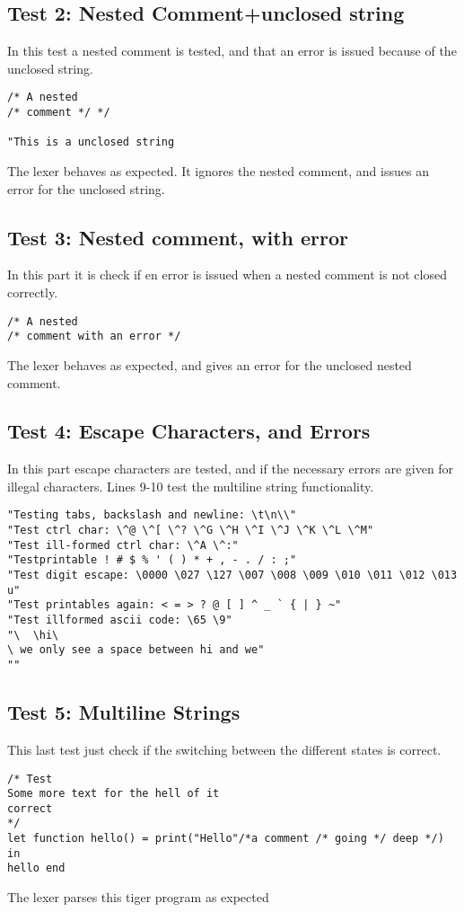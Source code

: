 \documentclass{article}
\begin{document}
\subsection{Test 2: Nested Comment+unclosed string}
In this test a nested comment is tested, and that an error is issued because of the unclosed string.

\begin{lstlisting}[frame=single]
/* A nested
/* comment */ */

"This is a unclosed string
\end{lstlisting}

The lexer behaves as expected. It ignores the nested comment, and issues an error for the unclosed string.

\subsection{Test 3: Nested comment, with error}
In this part it is check if en error is issued when a nested comment is not closed correctly.

\begin{lstlisting}[frame=single]
/* A nested
/* comment with an error */ 

\end{lstlisting}

The lexer behaves as expected, and gives an error for the unclosed nested comment.

\subsection{Test 4: Escape Characters, and Errors}
In this part escape characters are tested, and if the necessary errors are given for illegal characters.
Lines 9-10 test the multiline string functionality.


\begin{lstlisting}[frame=single]
"Testing tabs, backslash and newline: \t\n\\"
"Test ctrl char: \^@ \^[ \^? \^G \^H \^I \^J \^K \^L \^M"
"Test ill-formed ctrl char: \^A \^:"
"Testprintable ! # $ % ' ( ) * + , - . / : ;"
"Test digit escape: \0000 \027 \127 \007 \008 \009 \010 \011 \012 \013 u"
"Test printables again: < = > ? @ [ ] ^ _ ` { | } ~"
"Test illformed ascii code: \65 \9"
"\	\hi\
\ we only see a space between hi and we"
""
\end{lstlisting}

\subsection{Test 5: Multiline Strings}
This last test just check if the switching between the different states is correct.


\begin{lstlisting}[frame=single]
/* Test 
Some more text for the hell of it
correct
*/
let function hello() = print("Hello"/*a comment /* going */ deep */) in 
hello end
\end{lstlisting}
The lexer parses this tiger program as expected
\end{document}
